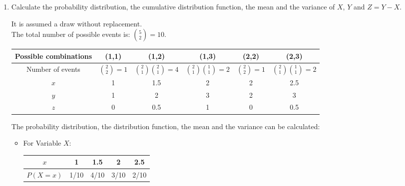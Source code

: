\documentclass[12pt,thmsa]{article}\usepackage[]{graphicx}\usepackage[]{color}
\begin{document}
\begin{enumerate}%
    \item Calculate the probability distribution, the cumulative distribution function, the mean and the variance of $X$, $Y$ and $Z = Y - X$.

\medskip

It is assumed a draw without replacement.\\
  The total number of possible events is: $\binom{5}{2}=10$.
	\begin{center}
         	\begin{tabular}{|c|c|c|c|c|c|}
					\hline
 				 	Possible combinations & (1,1) & (1,2) & (1,3) & (2,2) & (2,3)\\[1mm]
					\hline
						Number of events & $\binom{2}{2}=1$ & $\binom{2}{1}\binom{2}{1}=4$ & $\binom{2}{1}\binom{1}{1}=2$ &  $\binom{2}{2} =1$ & 			 	          $\binom{2}{1}\binom{1}{1}=2$\\[1mm]
					\hline
												$x$ & 1 & 1.5 & 2 & 2 & 2.5\\[1mm]
					\hline
												$y$ & 1 & 2 & 3 & 2 & 3\\[1mm]
					\hline
												$z$ & 0 & 0.5 & 1 & 0 & 0.5\\[1mm]
					\hline

					\end{tabular}
         	\end{center}

The probability distribution, the distribution function, the mean and the variance can be calculated:

\begin{itemize}

\item 		For Variable $X$:

			\begin{center}
			\begin{tabular}{|c|c|c|c|c|}
			\hline
			$x$ & 1 & 1.5 & 2 & 2.5\\
			\hline
			$P(X=x)$ & 1/10 & 4/10 & 3/10 & 2/10\\
			\hline
			\end{tabular}
			\end{center}


\end{itemize}
\end{enumerate}
\end{document}
